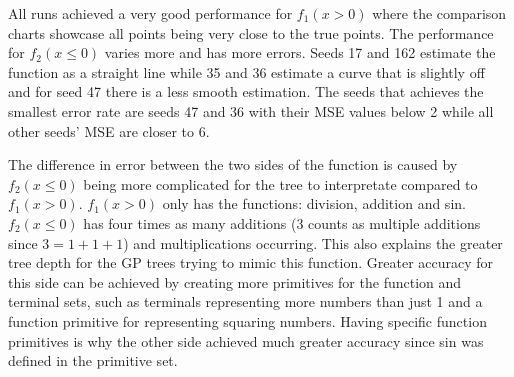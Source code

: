 \documentclass{article}
\begin{document}
All runs achieved a very good performance for $f_1(x > 0)$ where the comparison charts showcase all points being very close to the true points. The performance for $f_2(x \le 0)$ varies more and has more errors. Seeds 17 and 162 estimate the function as a straight line while 35 and 36 estimate a curve that is slightly off and for seed 47 there is a less smooth estimation. The seeds that achieves the smallest error rate are seeds 47 and 36 with their MSE values below 2 while all other seeds’ MSE are closer to 6. \par

\noindent The difference in error between the two sides of the function is caused by $f_2(x \le 0)$ being more complicated for the tree to interpretate compared to $f_1(x > 0)$. $f_1(x > 0)$ only has the functions: division, addition and sin. $f_2(x \le 0)$ has four times as many additions (3 counts as multiple additions since $3=1+1+1$) and multiplications occurring. This also explains the greater tree depth for the GP trees trying to mimic this function. Greater accuracy for this side can be achieved by creating more primitives for the function and terminal sets, such as terminals representing more numbers than just 1 and a function primitive for representing squaring numbers. Having specific function primitives is why the other side achieved much greater accuracy since sin was defined in the primitive set. \par
\clearpage
\end{document}
